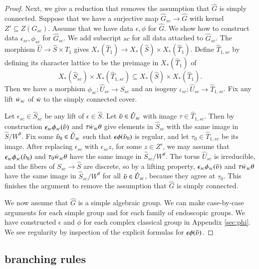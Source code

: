 \begin{proof}
  Next, we give a reduction that removes the assumption that $\hat G$
  is simply connected.  Suppose that we have a surjective map $\hat
  G_{sc}\to \hat G$ with kernel $Z' \subseteq Z(G_{sc})$.  Assume that
  we have data $\epsilon,\phi$ for $\hat G$.  We show how to construct
  data $\epsilon_{sc},\phi_{sc}$ for $\hat G_{sc}$.  We add subscript
  ${sc}$ for all data attached to $\hat G_{sc}$.  The morphism $\hat U
  \to \hat S\times \hat T_1$ gives $X_*(\hat T_1)\to X_*(\hat S)\times
  X_*(\hat T_1)$.  Define $\hat T_{1,sc}$ by defining its character
  lattice to be the preimage in $X_*(\hat T_1)$ of
\[
X_*(\hat S_{sc})\times X_*(\hat T_{1, sc}) 
\subseteq X_*(\hat S)\times X_*(\hat T_1).
\] 
Then we have a morphism $\phi_{sc}:\hat U_{sc}\to\hat S_{sc}$ and
an isogeny $\iota_{sc}:\hat U_{sc} \to \hat T_{1,sc}$.  Fix any lift
$\dot w_{sc}$ of $\dot w$ to the simply connected cover.

Let $\epsilon_{sc}\in \hat S_{sc}$ be any lift of $\epsilon\in \hat
S$.  Let $\tilde\upsilon\in \hat U_{sc}$ with image $\tau\in \hat T_{1,sc}$.
Then by construction $\epsilon_{sc}\phi_{sc}(\tilde\upsilon)$ and
$\tau\dot w_{sc}\theta$ give elements in $\hat S_{sc}$ with the same
image in $\hat S/W^\theta$.  Fix some $\tilde\upsilon_0\in \hat U_{sc}$ such that
$\epsilon\phi(\tilde\upsilon_0)$ is regular, and let $\tau_0\in \hat T_{1,sc}$ be
its image.  After replacing $\epsilon_{sc}$ with $\epsilon_{sc} z$,
for some $z\in Z'$, we may assume that $\epsilon_{sc}\phi_{sc}(\tilde\upsilon_0)$
and $\tau_0\dot w_{sc}\theta$ have the same image in $\hat
S_{sc}/W^\theta$.    The torus
$\hat U_{sc}$ is irreducible, and the fibers of $S_{sc}\to \hat S$ are
discrete, so by a lifting property, $\epsilon_{sc}\phi_{sc}(\tilde\upsilon)$ and
$\tau\dot w_{sc}\theta$ have the same image in $\hat S_{sc}/W^\theta$
for all $\tilde\upsilon\in\hat U_{sc}$, because they agree at $\tau_0$.  This
finishes the argument to remove the assumption that $\hat G$ is simply
connected.

We now assume that $\hat G$ is a simple algebraic group.  We can make
case-by-case arguments for each simple group and for each family of
endoscopic groups.  We have constructed $\epsilon$ and $\phi$ for each
complex classical group in Appendix \ref{sec:phi}.  We see regularity
by inspection of the explicit formulas for $\epsilon\phi(\tilde\upsilon)$.
\end{proof}


\subsection{branching rules}\label{sec:branch}

